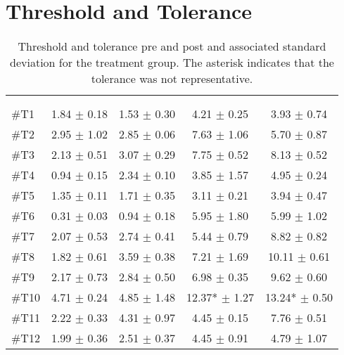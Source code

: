 \chapter{Threshold and Tolerance} \label{ThresTolA}

\begin{longtable} {l|c|c|c|c}
	\caption{Threshold and tolerance pre and post and associated standard deviation for the treatment group. The asterisk indicates that the tolerance was not representative.}
	\label{tab:Treatment} \\
\cellcolor[HTML]{C0C0C0} {} & 
\multicolumn{2}{c|}{ \cellcolor[HTML]{C0C0C0}{\textbf{Threshold}}} & \multicolumn{2}{c}{ \cellcolor[HTML]{C0C0C0}{\textbf{Tolerance}}}  	\\  \rule{0pt}{3ex} 
  \cellcolor[HTML]{C0C0C0}{} &
 \multicolumn{1}{c|}{ \cellcolor[HTML]{C0C0C0}{Pre [KgF]}} & \multicolumn{1}{c|}{ \cellcolor[HTML]{C0C0C0}{Post [KgF]}} 
 & \multicolumn{1}{|c|}{ \cellcolor[HTML]{C0C0C0}{Pre [KgF]}} 
 & \multicolumn{1}{c|}{ \cellcolor[HTML]{C0C0C0}{Post [KgF]}} 	\\ \hline 
\#T1 & 1.84 $\pm$ 0.18 & 1.53 $\pm$ 0.30 & 4.21 $\pm$ 0.25 & 3.93 $\pm$ 0.74 \\ \hline
\#T2 & 2.95 $\pm$ 1.02 & 2.85 $\pm$ 0.06 & 7.63 $\pm$ 1.06  & 5.70 $\pm$ 0.87 \\ \hline
\#T3 & 2.13 $\pm$ 0.51 & 3.07 $\pm$ 0.29 & 7.75 $\pm$ 0.52 & 8.13 $\pm$ 0.52 \\ \hline
\#T4 & 0.94 $\pm$ 0.15 & 2.34 $\pm$ 0.10 & 3.85 $\pm$ 1.57 & 4.95 $\pm$ 0.24 \\ \hline
\#T5 & 1.35 $\pm$ 0.11 & 1.71 $\pm$ 0.35 & 3.11 $\pm$ 0.21  & 3.94 $\pm$ 0.47 \\ \hline	
\#T6 & 0.31 $\pm$ 0.03 & 0.94 $\pm$ 0.18 & 5.95 $\pm$ 1.80 & 5.99 $\pm$  1.02\\ \hline
\#T7 & 2.07 $\pm$ 0.53  & 2.74 $\pm$ 0.41 & 5.44 $\pm$ 0.79 & 8.82 $\pm$ 0.82  \\ \hline
\#T8 & 1.82 $\pm$ 0.61 & 3.59 $\pm$ 0.38 & 7.21 $\pm$ 1.69 & 10.11 $\pm$ 0.61 \\ \hline
\#T9 & 2.17 $\pm$ 0.73 & 2.84 $\pm$ 0.50 & 6.98 $\pm$  0.35 & 9.62 $\pm$ 0.60 \\ \hline
\#T10 & 4.71 $\pm$ 0.24 & 4.85 $\pm$ 1.48  & 12.37*  $\pm$ 1.27  & 13.24* $\pm$ 0.50  \\ \hline
\#T11 & 2.22 $\pm$ 0.33 & 4.31 $\pm$ 0.97 & 4.45 $\pm$ 0.15 & 7.76 $\pm$  0.51 \\ \hline
\#T12 & 1.99 $\pm$ 0.36 & 2.51 $\pm$ 0.37  & 4.45 $\pm$ 0.91  & 4.79 $\pm$ 1.07  \\ \hline

\end{longtable}
